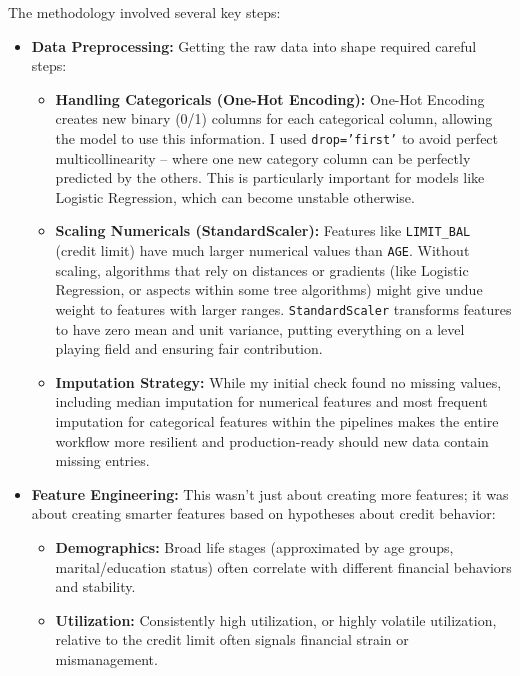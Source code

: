 \documentclass[a4paper,12pt]{article}
\begin{document}
The methodology involved several key steps:

\begin{itemize}
  \item \textbf{Data Preprocessing:} Getting the raw data into shape required careful steps:
  \begin{itemize}
    \item \textbf{Handling Categoricals (One-Hot Encoding):} One-Hot Encoding creates new binary (0/1) columns for each categorical column, allowing the model to use this information. I used \texttt{drop='first'} to avoid perfect multicollinearity – where one new category column can be perfectly predicted by the others. This is particularly important for models like Logistic Regression, which can become unstable otherwise.
    
    \item \textbf{Scaling Numericals (StandardScaler):} Features like \texttt{LIMIT\_BAL} (credit limit) have much larger numerical values than \texttt{AGE}. Without scaling, algorithms that rely on distances or gradients (like Logistic Regression, or aspects within some tree algorithms) might give undue weight to features with larger ranges. \texttt{StandardScaler} transforms features to have zero mean and unit variance, putting everything on a level playing field and ensuring fair contribution.
    
    \item \textbf{Imputation Strategy:} While my initial check found no missing values, including median imputation for numerical features and most frequent imputation for categorical features within the pipelines makes the entire workflow more resilient and production-ready should new data contain missing entries.
  \end{itemize}

  \item \textbf{Feature Engineering:} This wasn't just about creating more features; it was about creating smarter features based on hypotheses about credit behavior:
  \begin{itemize}
    \item \textbf{Demographics:} Broad life stages (approximated by age groups, marital/education status) often correlate with different financial behaviors and stability.
    
    \item \textbf{Utilization:} Consistently high utilization, or highly volatile utilization, relative to the credit limit often signals financial strain or mismanagement.
    

\end{itemize}
\end{itemize}
\end{document}
